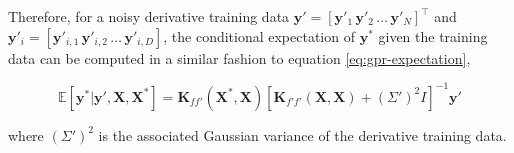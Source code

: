 \begin{spacing}{2.0}
    Therefore, for a noisy derivative training data $\mathbf{y}' = \left[\mathbf{y}'_1\,\mathbf{y}'_2\,\ldots\,\mathbf{y}'_N\right]^{\top}$ and
    $\mathbf{y}'_i = \left[\mathbf{y}'_{i,1}\,\mathbf{y}'_{i,2}\,\ldots\,\mathbf{y}'_{i,D}\right]$, the conditional expectation of 
    $\mathbf{y}^*$ given the training data can be computed in a similar fashion to equation \ref{eq:gpr-expectation},

    \begin{equation}
        \mathbb{E}\left[\mathbf{y}^*|\mathbf{y}',\mathbf{X},\mathbf{X}^*\right] = \mathbf{K}_{ff'}(\mathbf{X}^*,\mathbf{X})
            \left[\mathbf{K}_{f'f'}(\mathbf{X},\mathbf{X}) + (\Sigma')^2 I\right]^{-1}\mathbf{y}'
        \label{eq:gpr-der-expectation}
    \end{equation}

    \noindent where $(\Sigma')^2$ is the associated Gaussian variance of the derivative training data. 
\end{spacing}
